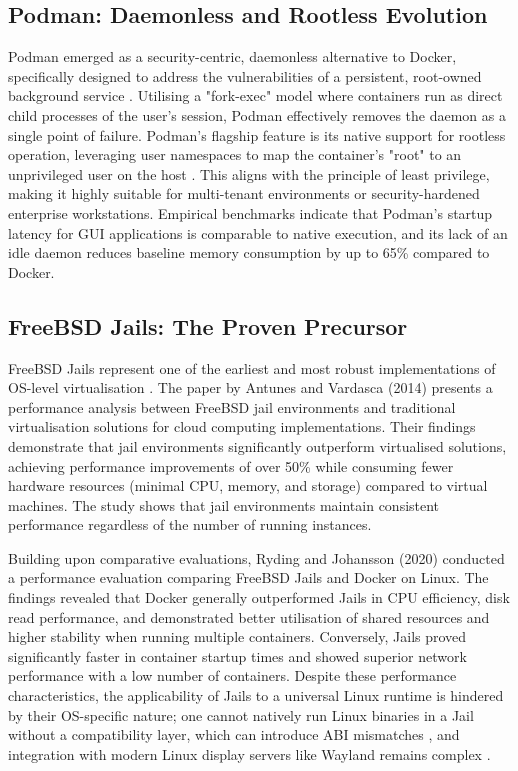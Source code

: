 \documentclass[journal,onecolumn]{IEEEtran}
\begin{document}
\subsection{Podman: Daemonless and Rootless Evolution}
Podman emerged as a security-centric, daemonless alternative to Docker, specifically designed to address the vulnerabilities of a persistent, root-owned background service \cite{Rinnemaki2025, Falesnik2024}. Utilising a "fork-exec" model where containers run as direct child processes of the user's session, Podman effectively removes the daemon as a single point of failure. Podman’s flagship feature is its native support for rootless operation, leveraging user namespaces to map the container’s "root" to an unprivileged user on the host \cite{Falesnik2024}. This aligns with the principle of least privilege, making it highly suitable for multi-tenant environments or security-hardened enterprise workstations. Empirical benchmarks indicate that Podman’s startup latency for GUI applications is comparable to native execution, and its lack of an idle daemon reduces baseline memory consumption by up to 65\% compared to Docker.

\subsection{FreeBSD Jails: The Proven Precursor}
FreeBSD Jails represent one of the earliest and most robust implementations of OS-level virtualisation \cite{Kamp2000jails}. The paper by Antunes and Vardasca (2014) \cite{ANTUNES2014649} presents a performance analysis between FreeBSD jail environments and traditional virtualisation solutions for cloud computing implementations. Their findings demonstrate that jail environments significantly outperform virtualised solutions, achieving performance improvements of over 50\% while consuming fewer hardware resources (minimal CPU, memory, and storage) compared to virtual machines. The study shows that jail environments maintain consistent performance regardless of the number of running instances. 

Building upon comparative evaluations, Ryding and Johansson (2020) \cite{Ryding_Johansson_2020} conducted a performance evaluation comparing FreeBSD Jails and Docker on Linux. The findings revealed that Docker generally outperformed Jails in CPU efficiency, disk read performance, and demonstrated better utilisation of shared resources and higher stability when running multiple containers. Conversely, Jails proved significantly faster in container startup times and showed superior network performance with a low number of containers. Despite these performance characteristics, the applicability of Jails to a universal Linux runtime is hindered by their OS-specific nature; one cannot natively run Linux binaries in a Jail without a compatibility layer, which can introduce ABI mismatches \cite{Antunes2014}, and integration with modern Linux display servers like Wayland remains complex \cite{Kong2025}.
\end{document}
